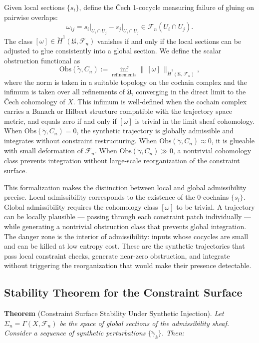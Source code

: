 \documentclass[12pt, a4paper]{article}
\begin{document}
Given local sections $\{s_i\}$, define the \v{C}ech 1-cocycle measuring failure of gluing on pairwise overlaps:
\[
\omega_{ij} = s_i\big|_{U_i \cap U_j} - s_j\big|_{U_i \cap U_j} \in \mathcal{F}_n(U_i \cap U_j).
\]
The class $[\omega] \in \check{H}^1(\mathfrak{U}, \mathcal{F}_n)$ vanishes if and only if the local sections can be adjusted to glue consistently into a global section. We define the scalar obstruction functional as
\[
\mathrm{Obs}(\tilde{\gamma}, C_n) := \inf_{\text{refinements}} \bigl\|\,[\omega]\,\bigr\|_{\check{H}^1(\mathfrak{U},\, \mathcal{F}_n)},
\]
where the norm is taken in a suitable topology on the cochain complex and the infimum is taken over all refinements of $\mathfrak{U}$, converging in the direct limit to the \v{C}ech cohomology of $X$. This infimum is well-defined when the cochain complex carries a Banach or Hilbert structure compatible with the trajectory space metric, and equals zero if and only if $[\omega]$ is trivial in the limit sheaf cohomology. When $\mathrm{Obs}(\tilde{\gamma}, C_n) = 0$, the synthetic trajectory is globally admissible and integrates without constraint restructuring. When $\mathrm{Obs}(\tilde{\gamma}, C_n) \approx 0$, it is glueable with small deformation of $\mathcal{F}_n$. When $\mathrm{Obs}(\tilde{\gamma}, C_n) \gg 0$, a nontrivial cohomology class prevents integration without large-scale reorganization of the constraint surface.

This formalization makes the distinction between local and global admissibility precise. Local admissibility corresponds to the existence of the 0-cochains $\{s_i\}$. Global admissibility requires the cohomology class $[\omega]$ to be trivial. A trajectory can be locally plausible --- passing through each constraint patch individually --- while generating a nontrivial obstruction class that prevents global integration. The danger zone is the interior of admissibility: inputs whose cocycles are small and can be killed at low entropy cost. These are the synthetic trajectories that pass local constraint checks, generate near-zero obstruction, and integrate without triggering the reorganization that would make their presence detectable.

\subsection{Stability Theorem for the Constraint Surface}

\textbf{Theorem}\label{thm:stability} (Constraint Surface Stability Under Synthetic Injection). \textit{Let $\Sigma_n = \Gamma(X, \mathcal{F}_n)$ be the space of global sections of the admissibility sheaf. Consider a sequence of synthetic perturbations $\{\tilde{\gamma}_k\}$. Then:}
\end{document}
